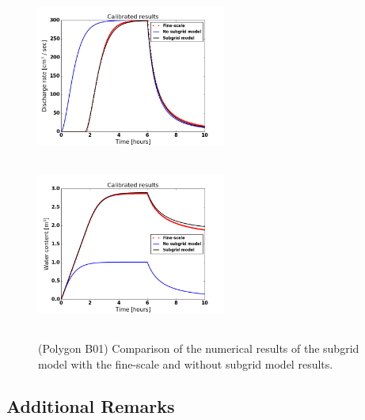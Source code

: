 \documentclass[review,11pt]{elsarticle}
\begin{document}
\begin{figure}[!h]
\centering
\includegraphics[width=6.2cm, height=5.5cm]{./figures/POLYGON_B01/POLYGON_B01dischargeCalibDDManning.png}
\includegraphics[width=6.2cm, height=5.5cm]{./figures/POLYGON_B01/POLYGON_B01watercontentCalibDDManning.png}
\caption{(Polygon B01) Comparison of the numerical results of the subgrid model with the fine-scale and without subgrid model results.}
\label{polygon-B01}
\end{figure}


\subsection{Additional Remarks}
\end{document}
